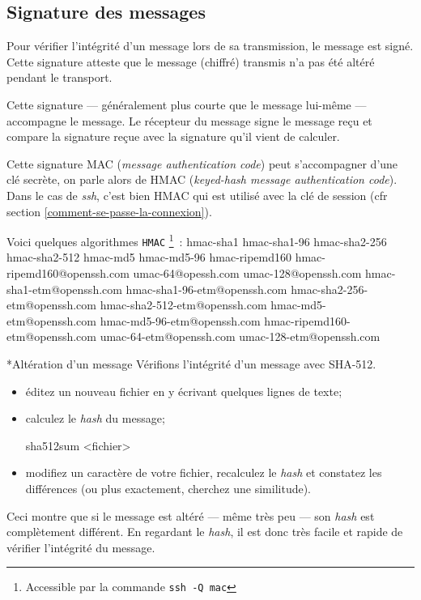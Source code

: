 \documentclass[a4paper,11pt]{article}
\begin{document}
\subsection{Signature des messages}
\label{signature}

Pour vérifier l'intégrité d'un message lors de sa transmission, le message est
signé. Cette signature atteste que le message (chiffré) transmis n'a pas été
altéré pendant le transport. 

Cette signature — généralement plus courte que le message lui-même — accompagne
le message. Le récepteur du message signe le message reçu et compare la
signature reçue avec la signature qu'il vient de calculer. 

Cette signature MAC (\textit{message authentication code}) peut s'accompagner
d'une clé secrète, on parle alors de HMAC (\textit{keyed-hash message
authentication code}). Dans le cas de \textit{ssh}, c'est bien HMAC qui est
utilisé avec la clé de session (cfr section \ref{comment-se-passe-la-connexion}). 

Voici quelques algorithmes \texttt{HMAC}
\footnote{Accessible par la commande \texttt{ssh -Q mac}}~:
hmac-sha1 hmac-sha1-96 hmac-sha2-256 hmac-sha2-512 hmac-md5 hmac-md5-96
hmac-ripemd160 hmac-ripemd160@openssh.com umac-64\-@opessh.com
umac-128@openssh.com hmac-sha1-etm@openssh.com hmac-sha1-96-etm\-@openssh.com
hmac-sha2-256-etm@openssh.com hmac-sha2-512-etm@openssh.com
h\-mac-md5-etm@openssh.com hmac-md5-96-etm@openssh.com
hmac-ripemd160-etm\-@o\-penssh.com umac-64-etm@openssh.com umac-128-etm@openssh.com

\bigskip
\begin{Exercice}*{Altération d'un message}
	Vérifions l'intégrité d'un message avec SHA-512. 

	\begin{itemize}
	
		\item éditez un nouveau fichier en y écrivant quelques lignes de texte;
		\item calculez le \textit{hash} du message; 

			\begin{term}
				sha512sum <fichier>
			\end{term}

		\item modifiez un caractère de votre fichier, recalculez le
			\textit{hash} et constatez les différences (ou plus exactement,
			cherchez une similitude).
	\end{itemize}

	Ceci montre que si le message est altéré — même très peu — son \textit{hash}
	est complètement différent. En regardant le \textit{hash}, il est donc très
	facile et rapide de vérifier l'intégrité du message. 

\end{Exercice}
\end{document}
